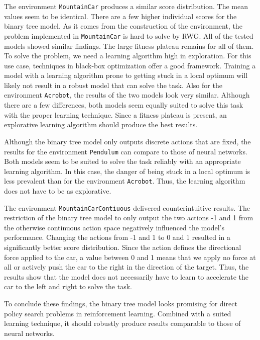 The environment \verb|MountainCar| produces a similar score distribution. The mean values seem to be identical. There are a few higher individual scores for the binary tree model. As it comes from the construction of the environment, the problem implemented in \verb|MountainCar| is hard to solve by RWG. All of the tested models showed similar findings. The large fitness plateau remains for all of them. To solve the problem, we need a learning algorithm high in exploration. For this use case, techniques in black-box optimization offer a good framework. Training a model with a learning algorithm prone to getting stuck in a local optimum will likely not result in a robust model that can solve the task. Also for the environment \verb|Acrobot|, the results of the two models look very similar. Although there are a few differences, both models seem equally suited to solve this task with the proper learning technique. Since a fitness plateau is present, an explorative learning algorithm should produce the best results.

Although the binary tree model only outputs discrete actions that are fixed, the results for the environment \verb|Pendulum| can compare to those of neural networks. Both models seem to be suited to solve the task reliably with an appropriate learning algorithm. In this case, the danger of being stuck in a local optimum is less prevalent than for the environment \verb|Acrobot|. Thus, the learning algorithm does not have to be as explorative.

The environment \verb|MountainCarContiuous| delivered counterintuitive results. The restriction of the binary tree model to only output the two actions -1 and 1 from the otherwise continuous action space negatively influenced the model's performance. Changing the actions from -1 and 1 to 0 and 1 resulted in a significantly better score distribution. Since the action defines the directional force applied to the car, a value between 0 and 1 means that we apply no force at all or actively push the car to the right in the direction of the target. Thus, the results show that the model does not necessarily have to learn to accelerate the car to the left and right to solve the task.

To conclude these findings, the binary tree model looks promising for direct policy search problems in reinforcement learning. Combined with a suited learning technique, it should robustly produce results comparable to those of neural networks.

